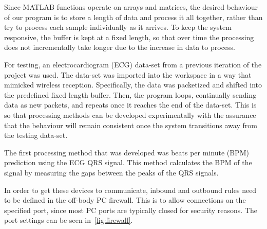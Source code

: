 Since MATLAB functions operate on arrays and matrices,
the desired behaviour of our program is to store a length of data and process it all together,
rather than try to process each sample individually as it arrives.
To keep the system responsive, the buffer is kept at a fixed length,
so that over time the processing does not incrementally take longer due to the increase in data to process.

For testing, an electrocardiogram (ECG) data-set from a previous iteration of the project was used.
The data-set was imported into the workspace in a way that mimicked wireless reception.
Specifically, the data was packetized and shifted into the predefined fixed length buffer.
Then, the program loops, continually sending data as new packets, and repeats once it reaches the end of the data-set.
This is so that processing methods can be developed experimentally
with the assurance that the behaviour will remain consistent once the system transitions away from the testing data-set.

The first processing method that was developed was beats per minute (BPM) prediction using the ECG QRS signal.
This method calculates the BPM of the signal by measuring the gaps between the peaks of the QRS signals.

In order to get these devices to communicate, inbound and outbound rules need to be defined in the off-body PC firewall.
This is to allow connections on the specified port, since most PC ports are typically closed for security reasons.
The port settings can be seen in~\autoref{fig:firewall}.

